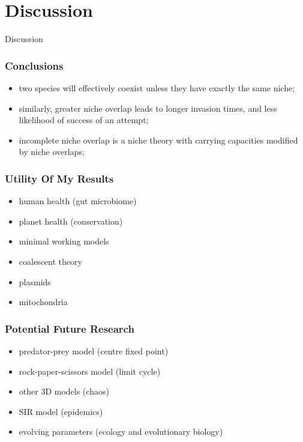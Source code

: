 \documentclass{beamer}
\begin{document}
\section[Discussion]{Discussion}

\begin{frame}
\centering
{{\Huge Discussion}}
\end{frame}


\begin{frame}
\frametitle{Conclusions}
\begin{itemize}
	\item two species will effectively coexist unless they have exactly the same niche; 
	\pause
	\item similarly, greater niche overlap leads to longer invasion times, and less likelihood of success of an attempt; 
	\pause
	\item incomplete niche overlap is a niche theory with carrying capacities modified by niche overlaps;
\end{itemize}
\end{frame}

\begin{frame}
\frametitle{Utility Of My Results}
\begin{itemize}
	\item human health (gut microbiome)%
	\item planet health (conservation)%
	\item minimal working models
	\item coalescent theory%
	\item plasmids
	\item mitochondria
\end{itemize}
\end{frame}

\begin{frame}
\frametitle{Potential Future Research}
\begin{itemize}
	\item predator-prey model (centre fixed point)
	\item rock-paper-scissors model (limit cycle)
	\item other 3D models (chaos)
	\item SIR model (epidemics)
	\item evolving parameters (ecology and evolutionary biology)
\end{itemize}
\end{frame}
\end{document}
